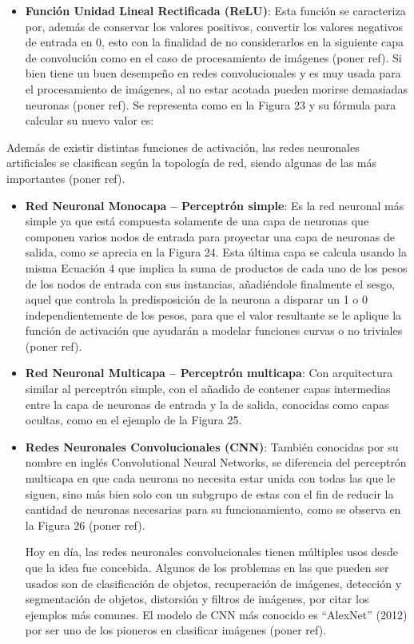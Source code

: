 \begin{itemize}
\begin{itemize}
	\item \textbf{Función Unidad Lineal Rectificada (ReLU)}: Esta función se caracteriza por, además de conservar los valores positivos, convertir los valores negativos de entrada en 0, esto con la finalidad de no considerarlos en la siguiente capa de convolución como en el caso de procesamiento de imágenes (poner ref). Si bien tiene un buen desempeño en redes convolucionales y es muy usada para el procesamiento de imágenes, al no estar acotada pueden morirse demasiadas neuronas (poner ref). Se representa como en la Figura 23 y su fórmula para calcular su nuevo valor es:
	\end{itemize}
	
	Además de existir distintas funciones de activación, las redes neuronales artificiales se clasifican según la topología de red, siendo algunas de las más importantes (poner ref).
	\begin{itemize}
		\item \textbf{Red Neuronal Monocapa – Perceptrón simple}: Es la red neuronal más simple ya que está compuesta solamente de una capa de neuronas que componen varios nodos de entrada para proyectar una capa de neuronas de salida, como se aprecia en la Figura 24. Esta última capa se calcula usando la misma Ecuación 4 que implica la suma de productos de cada uno de los pesos de los nodos de entrada con sus instancias, añadiéndole finalmente el sesgo, aquel que controla la predisposición de la neurona a disparar un 1 o 0 independientemente de los pesos, para que el valor resultante se le aplique la función de activación que ayudarán a modelar funciones curvas o no triviales (poner ref).
		
		\item \textbf{Red Neuronal Multicapa – Perceptrón multicapa}: Con arquitectura similar al perceptrón simple, con el añadido de contener capas intermedias entre la capa de neuronas de entrada y la de salida, conocidas como capas ocultas, como en el ejemplo de la Figura 25.
		
		\item \textbf{Redes Neuronales Convolucionales (CNN)}: También conocidas por su nombre en inglés Convolutional Neural Networks, se diferencia del perceptrón multicapa en que cada neurona no necesita estar unida con todas las que le siguen, sino más bien solo con un subgrupo de estas con el fin de reducir la cantidad de neuronas necesarias para su funcionamiento, como se observa en la Figura 26 (poner ref).
		
		Hoy en día, las redes neuronales convolucionales tienen múltiples usos desde que la idea fue concebida. Algunos de los problemas en las que pueden ser usados son de clasificación de objetos, recuperación de imágenes, detección y segmentación de objetos, distorsión y filtros de imágenes, por citar los ejemplos más comunes. El modelo de CNN más conocido es “AlexNet” (2012) por ser uno de los pioneros en clasificar imágenes (poner ref).
		

\end{itemize}
\end{itemize}
